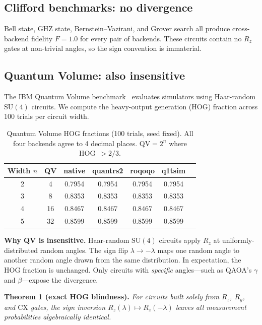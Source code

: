 \documentclass[11pt,a4paper]{article}
\begin{document}
\subsection{Clifford benchmarks: no divergence}

Bell state, GHZ state, Bernstein--Vazirani, and Grover search all produce
cross-backend fidelity $F = 1.0$ for every pair of backends. These circuits
contain no $R_z$ gates at non-trivial angles, so the sign convention is
immaterial.

\subsection{Quantum Volume: also insensitive}

The IBM Quantum Volume benchmark~\cite{cross2019validating} evaluates simulators
using Haar-random $\mathrm{SU}(4)$ circuits. We compute the heavy-output
generation (HOG) fraction across 100 trials per circuit width.

\begin{table}[h!]
\centering
\caption{Quantum Volume HOG fractions (100 trials, seed fixed). All four backends
         agree to 4 decimal places. QV$= 2^n$ where HOG~$> 2/3$.}
\label{tab:qv}
\begin{tabular}{ccccccc}
\toprule
Width $n$ & QV & native & quantrs2 & roqoqo & q1tsim \\
\midrule
2 & 4      & 0.7954 & 0.7954 & 0.7954 & 0.7954 \\
3 & 8      & 0.8353 & 0.8353 & 0.8353 & 0.8353 \\
4 & 16     & 0.8467 & 0.8467 & 0.8467 & 0.8467 \\
5 & 32     & 0.8599 & 0.8599 & 0.8599 & 0.8599 \\
\bottomrule
\end{tabular}
\end{table}

\textbf{Why QV is insensitive.} Haar-random $\mathrm{SU}(4)$ circuits apply
$R_z$ at uniformly-distributed random angles. The sign flip $\lambda \to
-\lambda$ maps one random angle to another random angle drawn from the same
distribution. In expectation, the HOG fraction is unchanged. Only circuits
with \emph{specific} angles---such as QAOA's $\gamma$ and $\beta$---expose the
divergence.

\textbf{Theorem 1 (exact HOG blindness).} \textit{For circuits built solely
from $R_z$, $R_y$, and $\mathrm{CX}$ gates, the sign inversion
$R_z(\lambda) \mapsto R_z(-\lambda)$ leaves all measurement probabilities
algebraically identical.}
\end{document}
